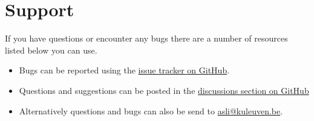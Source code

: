 \section{Support} \label{sec:questions-and-answers}
If you have questions or encounter any bugs there are a number of resources listed below you can use.

\begin{itemize}
\item Bugs can be reported using the \asli{} \href{https://github.com/tpms-lattice/ASLI/issues}{issue tracker on GitHub}.

\item Questions and suggestions can be posted in the 
\href{https://github.com/tpms-lattice/ASLI/discussions}{discussions section on GitHub}

\item Alternatively questions and bugs can also be send to \url{asli@kuleuven.be}.
\end{itemize}
